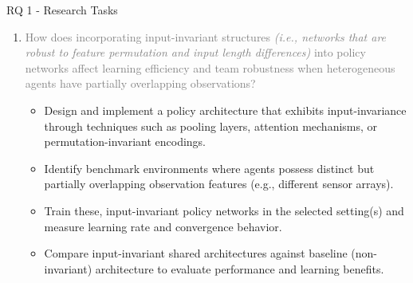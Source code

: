 \begin{frame}{RQ 1 - Research Tasks}
    \begin{enumerate}
        \item[RQ 1] \textcolor{gray}{
            How does incorporating input-invariant structures \emph{(i.e., networks 
            that are robust to feature permutation and input length differences)}
            into policy networks affect learning efficiency and team robustness 
            when heterogeneous agents have partially overlapping observations? } \vspace{1em}
    \begin{itemize}
        \item[RT 1.1] {
            Design and implement a policy architecture that exhibits input-invariance through 
            techniques such as pooling layers, attention mechanisms, or permutation-invariant 
            encodings.}
        \item[RT 1.2] {
            Identify benchmark environments where agents possess distinct but partially 
            overlapping observation features (e.g., different sensor arrays).}
        \item[RT 1.3] {
            Train these, input-invariant policy networks in the selected setting(s) and measure 
            learning rate and convergence behavior.}
        \item[RT 1.4] {
            Compare input-invariant shared architectures against baseline (non-invariant) 
            architecture to evaluate performance and learning benefits.}
    \end{itemize}
    \end{enumerate}
\end{frame}

